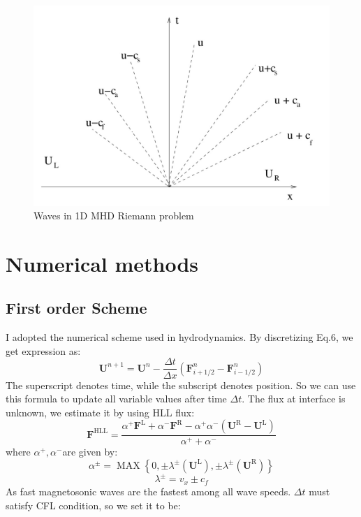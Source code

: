 \documentclass[11pt, oneside]{article}   	%
\begin{document}
\begin{figure}[H]
\centering
\includegraphics[scale = 0.2]{wave_structure.png}
\caption{Waves in 1D MHD Riemann problem}
\end{figure}


\section{Numerical methods}
\subsection{First order Scheme}
I adopted the numerical scheme used in hydrodynamics. By discretizing Eq.6, we get expression as:
\begin{equation}
    \mathbf { U } ^ { n + 1 } = \mathbf { U } ^ { n } - \frac { \Delta t } { \Delta x } \left( \mathbf { F } _ { i + 1 / 2 } ^ { n } - \mathbf { F } _ { i - 1 / 2 } ^ { n } \right)
\end{equation}
The superscript denotes time, while the subscript denotes position. So we can use this formula to update all variable values after time $\Delta t$. The flux at interface is unknown, we estimate it by using HLL flux:
\begin{equation}
    \mathbf { F } ^ { \mathrm { HLL } } = \frac { \alpha ^ { + } \mathbf { F } ^ { \mathrm { L } } + \alpha ^ { - } \mathbf { F } ^ { \mathrm { R } } - \alpha ^ { + } \alpha ^ { - } \left( \mathbf { U } ^ { \mathrm { R } } - \mathbf { U } ^ { \mathrm { L } } \right) } { \alpha ^ { + } + \alpha ^ { - } }
\end{equation}
where $\alpha ^ { + },\alpha ^ { - }$are given by:
\begin{equation}
    \alpha ^ { \pm } = \operatorname { MAX } \left\{ 0 , \pm \lambda ^ { \pm } \left( \mathbf { U } ^ { \mathrm { L } } \right) , \pm \lambda ^ { \pm } \left( \mathbf { U } ^ { \mathrm { R } } \right) \right\}
\end{equation}
\begin{equation}
    \lambda ^ { \pm } = v_x \pm c _ { f }
\end{equation}
As fast magnetosonic waves are the fastest among all wave speeds.
$\Delta t$ must satisfy CFL condition, so we set it to be:
\end{document}
